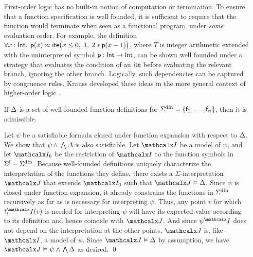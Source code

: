 First-order logic has no built-in notion of computation or termination. To ensure
that a function specification is well founded, it is sufficient to require that
the function would terminate when seen as a functional program, under \emph{some}
evaluation order. For example, the definition
$\forall x : {\mathsf{Int}}.\;\, 
\mathsf{p}( x ) \approx \mathsf{ite}\bigl( x \leq 0,\allowbreak\;  1,\allowbreak\;
  2 * \mathsf{p}( x - 1 ) \bigr)$,
where $T$ is integer arithmetic extended with the uninterpreted symbol 
$\mathsf{p}:\mathsf{Int} \rightarrow \mathsf{Int}$, can be shown well founded under a strategy that
evaluates the condition of an $\mathsf{ite}$ before evaluating the relevant branch,
ignoring the other branch. Logically, such dependencies can be captured by
congruence rules. Krauss developed these ideas in the more general context of
higher-order logic \cite[Section 2]{krauss-2009-phd}.

\begin{theorem}\label{thm:adm}
If $\DDD$ is a set of well-founded function definitions for\/
$\sfundefs{\Sigma} = \{\con{f}_1,\ldots,\con{f}_n\}$, then it is admissible.
\end{theorem}
\begin{proofsketch}
Let $\psi$ be a satisfiable formula closed under function expansion with
respect to $\DDD$. We show that $\psi \wedge \bigwedge \Delta$ is also
satisfiable. Let $\I$ be a model of $\psi$, and
let $\I_0$ be the restriction of $\I$ to the function symbols in $\sfuns{\Sigma} -
\sfundefs{\Sigma}$. Because well-founded definitions uniquely characterize
the interpretation of the functions they define, there exists a
$\Sigma$-interpretation $\J$ that extends $\I_0$ such that $\J \models \Delta$.
%
Since $\psi$ is closed under function expansion, it already constrains the
functions in $\sfundefs{\Sigma}$ recursively as far as is
necessary for interpreting $\psi$. Thus, any point $v$ for which
$\const{f}_i^\I(v)$ is needed for interpreting $\psi$ will have its
expected value according to its definition and hence coincide with $\J$.
And since $\psi^\I$ does not depend on the interpretation at the other
points, $\J$ is, like $\I$, a model of $\psi$.
Since $\J \models \Delta$ by assumption, we have $\J \models \psi \wedge
\bigwedge \Delta$ as desired.
\qed
\end{proofsketch}


